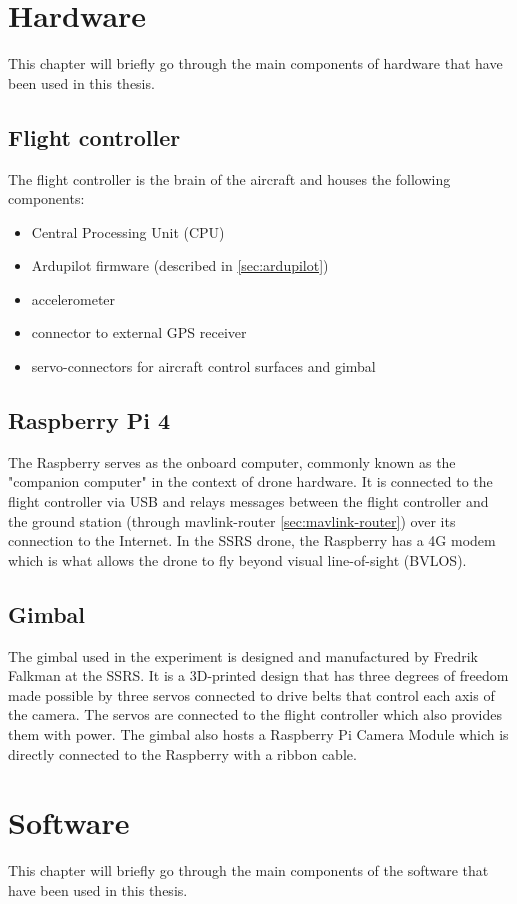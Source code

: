 \documentclass[nofilelist]{cslthse-msc}
\begin{document}
\section{Hardware}
This chapter will briefly go through the main components of hardware that have been used in this thesis.

\subsection{Flight controller}
The flight controller is the brain of the aircraft and houses the following components:
\begin{itemize}
   \item Central Processing Unit (CPU)
   \item Ardupilot firmware (described in \ref*{sec:ardupilot})
   \item accelerometer
   \item connector to external GPS receiver
   \item servo-connectors for aircraft control surfaces and gimbal
\end{itemize}
   
\subsection{Raspberry Pi 4}
The Raspberry serves as the onboard computer, commonly known as the "companion computer" in the context of drone hardware. It is connected to the flight controller via USB and relays messages between the flight controller and the ground station (through mavlink-router \ref{sec:mavlink-router}) over its connection to the Internet. In the SSRS drone, the Raspberry has a 4G modem which is what allows the drone to fly beyond visual line-of-sight (BVLOS).

\subsection{Gimbal}
The gimbal used in the experiment is designed and manufactured by Fredrik Falkman at the SSRS. It is a 3D-printed design that has three degrees of freedom made possible by three servos connected to drive belts that control each axis of the camera. The servos are connected to the flight controller which also provides them with power. The gimbal also hosts a Raspberry Pi Camera Module which is directly connected to the Raspberry with a ribbon cable.  

\section{Software}
This chapter will briefly go through the main components of the software that have been used in this thesis.
\end{document}
